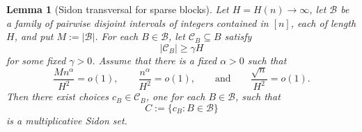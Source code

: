 \documentclass[11pt,reqno]{amsart}
\numberwithin{equation}{section}
\theoremstyle{plain}
\newtheorem{lemma}[theorem]{Lemma}
\theoremstyle{definition}
\begin{document}
\begin{lemma}[Sidon transversal for sparse blocks]
\label{lem:sparse-transversal}
Let \(H=H(n)\to\infty\), let \(\mathcal B\) be a family of pairwise disjoint
intervals of integers contained in \([n]\), each of length \(H\), and put
\(M:=|\mathcal B|\).  For each \(B\in\mathcal B\), let
\(\mathcal C_B\subseteq B\) satisfy
\[
        |\mathcal C_B|\ge \gamma H
\]
for some fixed \(\gamma>0\).  Assume that there is a fixed \(\alpha>0\) such
that
\[
        \frac{M n^\alpha}{H^2}=o(1),
        \qquad
        \frac{n^\alpha}{H^2}=o(1),
        \qquad\text{and}\qquad
        \frac{\sqrt n}{H^2}=o(1).
\]
Then there exist choices \(c_B\in\mathcal C_B\), one for each
\(B\in\mathcal B\), such that
\[
        C:=\{c_B:B\in\mathcal B\}
\]
is a multiplicative Sidon set.
\end{lemma}
\end{document}
